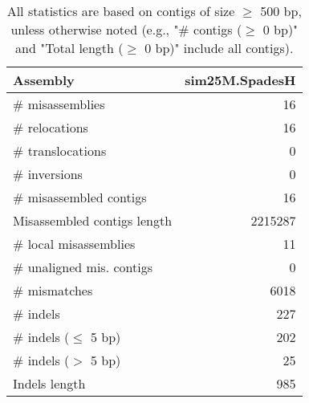 \documentclass[12pt,a4paper]{article}
\begin{document}
\begin{table}[ht]
\begin{center}
\caption{All statistics are based on contigs of size $\geq$ 500 bp, unless otherwise noted (e.g., "\# contigs ($\geq$ 0 bp)" and "Total length ($\geq$ 0 bp)" include all contigs).}
\begin{tabular}{|l*{1}{|r}|}
\hline
Assembly & sim25M.SpadesH \\ \hline
\# misassemblies & 16 \\ \hline
\hspace{5mm}\# relocations & 16 \\ \hline
\hspace{5mm}\# translocations & 0 \\ \hline
\hspace{5mm}\# inversions & 0 \\ \hline
\# misassembled contigs & 16 \\ \hline
Misassembled contigs length & 2215287 \\ \hline
\# local misassemblies & 11 \\ \hline
\# unaligned mis. contigs & 0 \\ \hline
\# mismatches & 6018 \\ \hline
\# indels & 227 \\ \hline
\hspace{5mm}\# indels ($\leq$ 5 bp) & 202 \\ \hline
\hspace{5mm}\# indels ($>$ 5 bp) & 25 \\ \hline
Indels length & 985 \\ \hline
\end{tabular}
\end{center}
\end{table}
\end{document}

